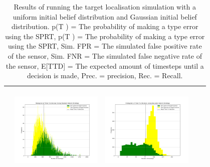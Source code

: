 \begin{landscape}
\begin{table}[h!]
\begin{tabular}{ | c | c | c | c | c |}
\begin{minipage}[c][45mm][c]{45mm}
    \end{minipage}
    &
    \begin{minipage}[c][45mm][c]{45mm}
      \includegraphics[width=44mm, height=44mm]{Chapters/MultiAgentTargetDetection/Figs/Histograms/VaryingInitBelief/25/25RandomHistogram.png}
    \end{minipage}
    &
    \begin{minipage}[c][45mm][c]{45mm}
      \includegraphics[width=44mm, height=44mm]{Chapters/MultiAgentTargetDetection/Figs/Histograms/VaryingInitBelief/25/25SaccadicHistogram.png}
    \end{minipage}
    \\
    \hline
   
  \end{tabular}
  \caption{Results of running the target localisation simulation with a  uniform initial belief distribution and Gaussian initial belief distribution. p(T ) = The probability of making a type  error using the SPRT, p(T ) = The probability of making a type  error using the SPRT, Sim. FPR = The simulated false positive rate of the sensor, Sim. FNR = The simulated false negative rate of the sensor, E[TTD] = The expected amount of timesteps until a decision is made, Prec. = precision, Rec. = Recall. }\label{table:ORToolsResults}
\end{table}



\end{landscape}
